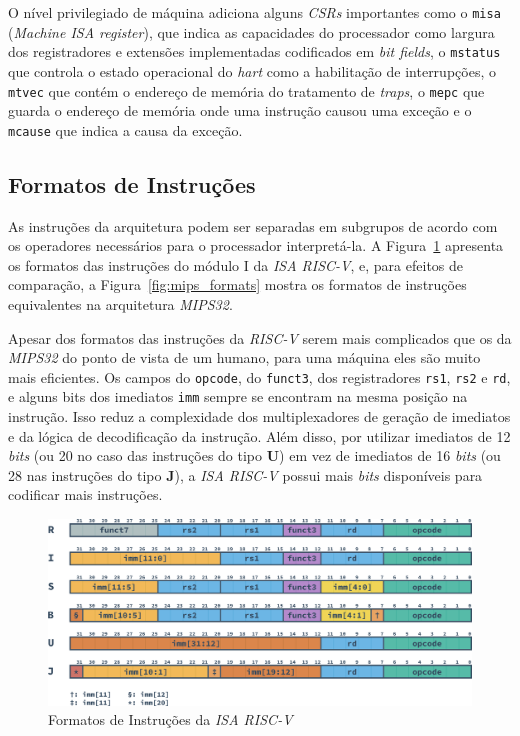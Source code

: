     { O nível privilegiado de máquina adiciona alguns \textit{CSRs} importantes
        como o \texttt{misa} (\textit{Machine ISA register}), que indica as
        capacidades do processador como largura dos registradores e extensões
        implementadas codificados em \textit{bit fields}, o \texttt{mstatus}
        que controla o estado operacional do \textit{hart} como a habilitação
        de interrupções, o \texttt{mtvec} que contém o endereço de memória
        do tratamento de \textit{traps}, o \texttt{mepc} que guarda o endereço
        de memória onde uma instrução causou uma exceção e o \texttt{mcause}
        que indica a causa da exceção.
    }

    \subsection{Formatos de Instruções}
    { As instruções da arquitetura podem ser separadas em subgrupos de acordo com
        os operadores necessários para o processador interpretá-la. A
        Figura~\ref{fig:riscv_formats} apresenta os formatos das instruções do
        módulo I da \textit{ISA RISC-V}, e, para efeitos de comparação, a
        Figura~\ref{fig:mips_formats} mostra os formatos de instruções equivalentes
        na arquitetura \textit{MIPS32}.
    }

    { Apesar dos formatos das instruções da \textit{RISC-V} serem mais
        complicados que os da \textit{MIPS32} do ponto de vista de um
        humano, para uma máquina eles são muito mais eficientes. Os campos
        do \texttt{opcode}, do \texttt{funct3}, dos registradores \texttt{rs1},
        \texttt{rs2} e \texttt{rd}, e alguns bits dos imediatos \texttt{imm}
        sempre se encontram na mesma posição na instrução. Isso reduz a
        complexidade dos multiplexadores de geração de imediatos e da lógica
        de decodificação da instrução. Além disso, por utilizar imediatos de
        12 \textit{bits} (ou 20 no caso das instruções do tipo \textbf{U})
        em vez de imediatos de 16 \textit{bits} (ou 28 nas instruções do
        tipo \textbf{J}), a \textit{ISA RISC-V} possui mais \textit{bits}
        disponíveis para codificar mais instruções.
    }

    \begin{figure}[H]
    \centering
        \includegraphics[width=.9\linewidth]
        {../images/instructions/rv32_instructions.png}
        \caption{Formatos de Instruções da \textit{ISA RISC-V}}\label{fig:riscv_formats}
    \end{figure}


